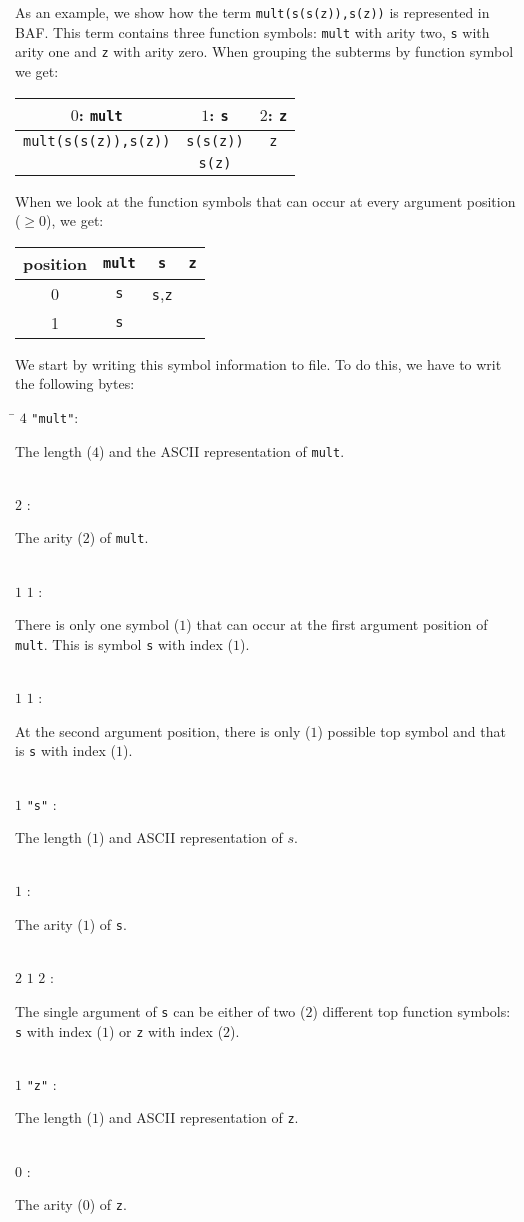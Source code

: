 \documentclass{article}
\newcommand{\tabline}[2]
{#1\>: 
\begin{minipage}[t]{\textwidth-1.5cm}
#2
\end{minipage}}
\begin{document}
As an example, we show how the term \texttt{mult(s(s(z)),s(z))} is represented in BAF. This term contains three function 
symbols: \texttt{mult} with arity two, \texttt{s} with arity one  and \texttt{z} with arity zero. When grouping the subterms by function symbol we get:
\begin{center}
\begin{tabular}{|c|c|c|}
\hline
$0$: \texttt{mult}&$1$: \texttt{s}&$2$: \texttt{z}\\
\hline
\texttt{mult(s(s(z)),s(z))}&\texttt{s(s(z))}&\texttt{z}\\
                           &\texttt{s(z)}&\\
\hline
\end{tabular}
\end{center}
When we look at the function symbols that can occur at every argument position ($\geq 0$), we get:
\begin{center}
\begin{tabular}{|c|c|c|c|}
\hline
position&\texttt{mult}&\texttt{s}&\texttt{z}\\
\hline
0&\texttt{s}&\texttt{s},\texttt{z}&\\
1&\texttt{s}&&\\
\hline

\end{tabular}
\end{center}
We start by writing this symbol information to file. To do this, we have to writ the following bytes:
\begin{tabbing}
\hspace{1.5cm}\=\kill
\tabline{$4$ \texttt{"mult"}}{The length ($4$) and the ASCII representation of \texttt{mult}.}\\
\tabline{$2$                }{The arity ($2$) of \texttt{mult}.}\\
\tabline{$1$ $1$            }{There is only one symbol ($1$) that can occur at the first argument position of 
                              \texttt{mult}. This is symbol \texttt{s} with index ($1$).}\\
\tabline{$1$ $1$            }{At the second argument position, there is only ($1$) possible top symbol and that is 
                              \texttt{s} with index ($1$).}\\
\tabline{$1$ \texttt{"s"}   }{The length ($1$) and ASCII representation of $s$.}\\
\tabline{$1$                }{The arity ($1$) of \texttt{s}.}\\
\tabline{$2$ $1$ $2$        }{The single argument of \texttt{s} can be either of two ($2$) different top function
                              symbols: \texttt{s} with index ($1$) or \texttt{z} with index ($2$).}\\
\tabline{$1$ \texttt{"z"}   }{The length ($1$) and ASCII representation of \texttt{z}.}\\
\tabline{$0$                }{The arity ($0$) of \texttt{z}.}
\end{tabbing}
\end{document}
